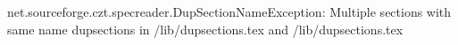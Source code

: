 net.sourceforge.czt.specreader.DupSectionNameException: Multiple sections with same name dupsections in /lib/dupsections.tex and /lib/dupsections.tex